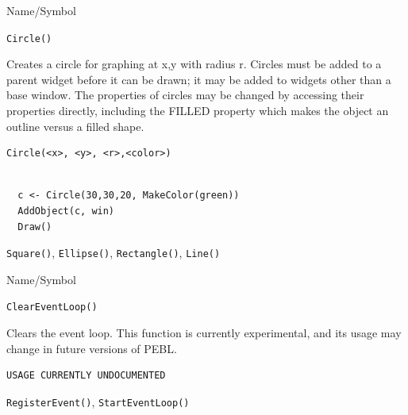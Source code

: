 \begin{desc}{Name/Symbol}
\item[Name/Symbol]	\verb+Circle()+

\item[Description] Creates a circle for graphing at x,y with radius r.
  Circles must be added to a parent widget before it can be drawn; it
  may be added to widgets other than a base window. The properties of
  circles may be changed by accessing their properties directly,
  including the FILLED property which makes the object an outline
  versus a filled shape.


\item[Usage]
\begin{verbatim}
Circle(<x>, <y>, <r>,<color>)
\end{verbatim}

\item[Example]	
\begin{verbatim}
  
  c <- Circle(30,30,20, MakeColor(green))
  AddObject(c, win)
  Draw()

\end{verbatim}
\item[See Also]	\verb+Square()+, \verb+Ellipse()+, \verb+Rectangle()+, \verb+Line()+
\end{desc}



\begin{desc}{Name/Symbol}
\item[Name/Symbol]  	\verb+ClearEventLoop()+ 

\item[Description]  Clears the event loop.  This function is currently experimental, and its usage may change in future versions of PEBL.

\item[Usage]       	
\begin{verbatim}
USAGE CURRENTLY UNDOCUMENTED
\end{verbatim}

\item[Example]	

\item[See Also] 
\verb+RegisterEvent()+, \verb+StartEventLoop()+
\end{desc}





